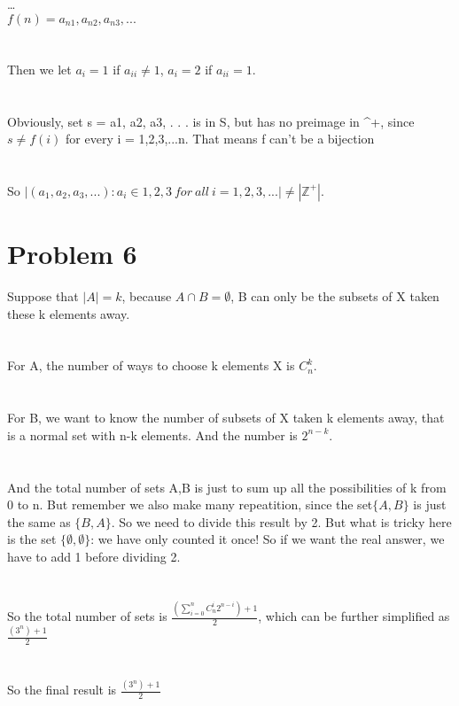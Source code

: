 \documentclass{article}
\begin{document}
\dots\\
$f(n) = {a_{n1}, a_{n2}, a_{n3}, . . .}$\\
\\ \hspace*{\fill} \\
Then we let $a_i = 1$ if $a_{ii} \neq 1$, $a_i = 2$ if $a_{ii} = 1$.\\
\\ \hspace*{\fill} \\
Obviously, set s = {a1, a2, a3, . . .} is in S, but has no preimage in ^+, since $s \neq f(i)$ for every i = 1,2,3,...n. That means f can't be a bijection\\
\\ \hspace*{\fill} \\
So $|{(a_1, a_2, a_3, . . .) : a_i \in {1, 2, 3}\ for\ all\ i = 1, 2, 3, . . .}| \neq |\mathbb{Z}^+|$.\\
\newpage
\section{Problem 6}
Suppose that $|A| = k$, because $A \cap B = \emptyset$, B can only be the subsets of X taken these k elements away.\\
\\ \hspace*{\fill} \\
For A, the number of ways to choose k elements X is $C_n^k$.\\
\\ \hspace*{\fill} \\
For B, we want to know the number of subsets of X taken k elements away, that is a normal set with n-k elements. And the number is $2^{n-k}$.\\
\\ \hspace*{\fill} \\
And the total number of sets {A,B} is just to sum up all the possibilities of k from 0 to n. But remember we also make many repeatition, since the set$\{A,B\}$ is just the same as $\{B,A\}$. So we need to divide this result by 2. But what is tricky here is the set $\{\emptyset,\emptyset \} $: we have only counted it once! So if we want the real answer, we have to add 1 before dividing 2.\\
\\ \hspace*{\fill} \\
So the total number of sets is $\frac{(\sum_{i=0}^{n}C_n^i2^{n-i})+1}{2} $, which can be further simplified as $\frac{(3^n)+1}{2} $\\
\\ \hspace*{\fill} \\
So the final result is $\frac{(3^n)+1}{2} $
\end{document}

